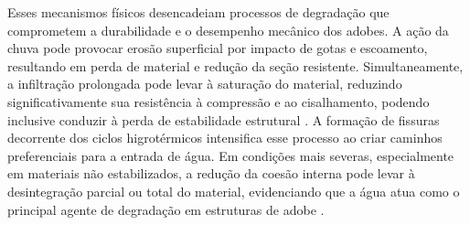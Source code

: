 
Esses mecanismos físicos desencadeiam processos de degradação que comprometem a durabilidade e o desempenho mecânico dos adobes. A ação da chuva pode provocar erosão superficial por impacto de gotas e escoamento, resultando em perda de material e redução da seção resistente. Simultaneamente, a infiltração prolongada pode levar à saturação do material, reduzindo significativamente sua resistência à compressão e ao cisalhamento, podendo inclusive conduzir à perda de estabilidade estrutural \cite{Gerard2015, Bui2014}. A formação de fissuras decorrente dos ciclos higrotérmicos intensifica esse processo ao criar caminhos preferenciais para a entrada de água. Em condições mais severas, especialmente em materiais não estabilizados, a redução da coesão interna pode levar à desintegração parcial ou total do material, evidenciando que a água atua como o principal agente de degradação em estruturas de adobe \cite{Beckett2020, Ratchakrom2021, Guettatfi2021}. 





